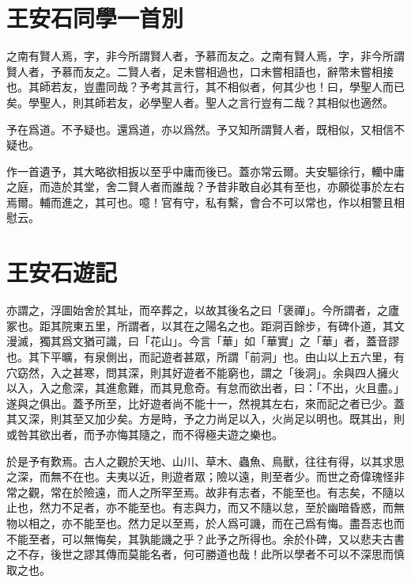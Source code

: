 \theendnotes

\section[同學一首別子固\quad{\small 王安石}]{{\normalsize 王安石}\quad 同學一首別}
之南有賢人焉，字，非今所謂賢人者，予慕而友之。之南有賢人焉，字，非今所謂賢人者，予慕而友之。二賢人者，足未嘗相過也，口未嘗相語也，辭幣未嘗相接也。其師若友，豈盡同哉？予考其言行，其不相似者，何其少也！曰，學聖人而已矣。學聖人，則其師若友，必學聖人者。聖人之言行豈有二哉？其相似也適然。

予在爲道。不予疑也。還爲道，亦以爲然。予又知所謂賢人者，既相似，又相信不疑也。

作一首遺予，其大略欲相扳以至乎中庸而後已。蓋亦常云爾。夫安驅徐行，轥中庸之庭，而造於其{堂}，舍二賢人者而誰哉？予昔非敢自必其有至也，亦願從事於左右焉爾。輔而進之，其可也。噫！官有守，私有繫，會合不可以常也，作以相警且相慰云。%

\section[遊褒禪山記\quad{\small 王安石}]{{\normalsize 王安石}\quad 遊記}
亦謂之，浮圖始舍於其址，而卒葬之，以故其後名之曰「褒禪」。今所謂者，之廬冢也。距其院東五里，所謂者，以其在之陽名之也。距洞百餘步，有碑仆道，其文漫滅，獨其爲文猶可識，曰「花山」。今言「華」如「華實」之「華」者，蓋音謬也。其下平曠，有泉側出，而記遊者甚眾，所謂「前洞」也。由山以上五六里，有穴窈然，入之甚寒，問其深，則其好遊者不能窮也，謂之「後洞」。余與四人擁火以入，入之愈深，其進愈難，而其見愈奇。有怠而欲出者，曰：「不出，火且盡。」遂與之俱出。蓋予所至，比好遊者尚不能十一，然視其左右，來而記之者已少。蓋其又深，則其至又加少矣。方是時，予之力尚足以入，火尚足以明也。既其出，則或咎其欲出者，而予亦悔其隨之，而不得極夫遊之樂也。

於是予有歎焉。古人之觀於天地、山川、草木、蟲魚、鳥獸，往往有得，以其求思之深，而無不在也。夫夷以近，則遊者眾；險以遠，則至者少。而世之奇偉瑰怪非常之觀，常在於險遠，而人之所罕至焉。故非有志者，不能至也。有志矣，不隨以止也，然力不足者，亦不能至也。有志與力，而又不隨以怠，至於幽暗昏惑，而無物以相之，亦不能至也。然力足以至焉，於人爲可譏，而在己爲有悔。盡吾志也而不能至者，可以無悔矣，其孰能譏之乎？此予之所得也。余於仆碑，又以悲夫古書之不存，後世之謬其傳而莫能名者，何可勝道也哉！此所以學者不可以不深思而慎取之也。

